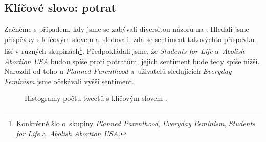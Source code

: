 \documentclass[12pt, a4paper]{article}
\numberwithin{equation}{section} 	%
\begin{document}
\subsection{Klíčové slovo: potrat}\label{subsec:abortion}
\noindent Začněme s případem, kdy jsme se zabývali diversitou názorů na \textit{}. Hledali jsme příspěvky s klíčovým slovem \textit{} a~sledovali, zda se sentiment takovýchto příspevků liší v různých skupinách\footnote{Konkrétně šlo o~skupiny \textit{Planned Parenthood}, \textit{Everyday Feminism}, \textit{Students for Life} a~\textit{Abolish Abortion USA}.}. Předpokládali jsme, že \textit{Students for Life} a~\textit{Abolish Abortion USA} budou spíše proti potratům, jejich sentiment bude tedy spíše nižší. Narozdíl od toho u \textit{Planned Parenthood} a~uživatelů sledujících \textit{Everyday Feminism} jsme očekávali vyšší sentiment.
\begin{figure}[!h]
\centering
{}
\caption[]{Histogramy počtu tweetů s klíčovým slovem \textit{}.}
\label{fig:abortion-all}
\end{figure}
\end{document}
